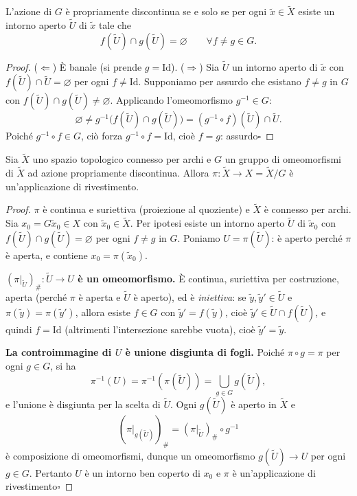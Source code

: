 \begin{prop}
L'azione di $G$ \`e propriamente discontinua se e solo se per ogni $\widetilde{x} \in \widetilde{X}$ esiste un intorno aperto $\widetilde{U}$ di $\widetilde{x}$ tale che
\[
f(\widetilde{U}) \cap g(\widetilde{U}) = \varnothing \qquad \forall f \neq g \in G.
\]
\end{prop}
\begin{proof}
($\Leftarrow$) \`E banale (si prende $g = \mathrm{Id}$).
($\Rightarrow$) Sia $\widetilde{U}$ un intorno aperto di $\widetilde{x}$ con $f(\widetilde{U}) \cap \widetilde{U} = \varnothing$ per ogni $f \neq \mathrm{Id}$. Supponiamo per assurdo che esistano $f \neq g$ in $G$ con $f(\widetilde{U}) \cap g(\widetilde{U}) \neq \varnothing$. Applicando l'omeomorfismo $g^{-1} \in G$:
\[
\varnothing \neq g^{-1}\big( f(\widetilde{U}) \cap g(\widetilde{U}) \big) = (g^{-1} \circ f)(\widetilde{U}) \cap \widetilde{U}.
\]
Poich\'e $g^{-1} \circ f \in G$, ci\`o forza $g^{-1} \circ f = \mathrm{Id}$, cio\`e $f = g$: assurdo\hfill$\square$
\end{proof}

\begin{teo}
Sia $\widetilde{X}$ uno spazio topologico connesso per archi e $G$ un gruppo di omeomorfismi di $\widetilde{X}$ ad azione propriamente discontinua. Allora $\pi: \widetilde{X} \to X = \widetilde{X}/G$ \`e un'applicazione di rivestimento.
\end{teo}
\begin{proof}
$\pi$ \`e continua e suriettiva (proiezione al quoziente) e $\widetilde{X}$ \`e connesso per archi. Sia $x_0 = G\widetilde{x}_0 \in X$ con $\widetilde{x}_0 \in \widetilde{X}$. Per ipotesi esiste un intorno aperto $\widetilde{U}$ di $\widetilde{x}_0$ con $f(\widetilde{U}) \cap g(\widetilde{U}) = \varnothing$ per ogni $f \neq g$ in $G$. Poniamo $U = \pi(\widetilde{U})$: \`e aperto perch\'e $\pi$ \`e aperta, e contiene $x_0 = \pi(\widetilde{x}_0)$.

\textbf{$(\pi|_{\widetilde{U}})_\#: \widetilde{U} \to U$ \`e un omeomorfismo.} \`E continua, suriettiva per costruzione, aperta (perch\'e $\pi$ \`e aperta e $\widetilde{U}$ \`e aperto), ed \`e \emph{iniettiva}: se $\widetilde{y}, \widetilde{y}' \in \widetilde{U}$ e $\pi(\widetilde{y}) = \pi(\widetilde{y}')$, allora esiste $f \in G$ con $\widetilde{y}' = f(\widetilde{y})$, cio\`e $\widetilde{y}' \in \widetilde{U} \cap f(\widetilde{U})$, e quindi $f = \mathrm{Id}$ (altrimenti l'intersezione sarebbe vuota), cio\`e $\widetilde{y}' = \widetilde{y}$.

\textbf{La controimmagine di $U$ \`e unione disgiunta di fogli.} Poich\'e $\pi \circ g = \pi$ per ogni $g \in G$, si ha
\[
\pi^{-1}(U) = \pi^{-1}(\pi(\widetilde{U})) = \bigcup_{g \in G} g(\widetilde{U}),
\]
e l'unione \`e disgiunta per la scelta di $\widetilde{U}$. Ogni $g(\widetilde{U})$ \`e aperto in $\widetilde{X}$ e
\[
(\pi|_{g(\widetilde{U})})_\# = (\pi|_{\widetilde{U}})_\# \circ g^{-1}
\]
\`e composizione di omeomorfismi, dunque un omeomorfismo $g(\widetilde{U}) \to U$ per ogni $g \in G$. Pertanto $U$ \`e un intorno ben coperto di $x_0$ e $\pi$ \`e un'applicazione di rivestimento\hfill$\square$
\end{proof}

